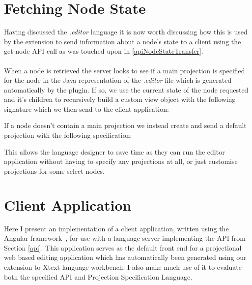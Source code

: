 \documentclass{article}
\begin{document}
\section{Fetching Node State}\label{viewObject}

Having discussed the \emph{.editor} language it is now worth discussing how this is used by the extension to send information about a node's state to a client using the get-node API call as was touched upon in \ref{apiNodeStateTransfer}. 
\\
\\
When a node is retrieved the server looks to see if a main projection is specified for the node in the Java representation of the \emph{.editor} file which is generated automatically by the plugin. If so, we use the current state of the node requested and it's children to recursively build a custom view object with the following signature which we then send to the client application:

If a node doesn't contain a main projection we instead create and send a default projection with the following specification: 

This allows the language designer to save time as they can run the editor application without having to specify any projections at all, or just customise projections for some select nodes. 


\section{Client Application}\label{clientApp}
Here I present an implementation of a client application, written using the Angular framework~\cite{angular}, for use with a language server implementing the API from Section \ref{api}. This application serves as the default front end for a projectional web based editing application which has automatically been generated using our extension to Xtext language workbench. I also make much use of it to evaluate both the specified API and Projection Specification Language. 
\end{document}
